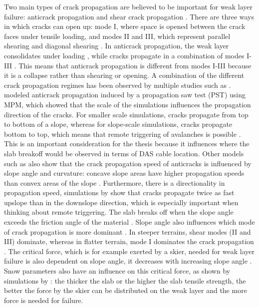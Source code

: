   Two main types of crack propagation are believed to be important for weak layer failure: anticrack propagation and shear crack propagation \parencite{bergfeldSignaturesSubRayleighSupershear2025}. There are three ways in which cracks can open up: mode I, where space is opened between the crack faces under tensile loading, and modes II and III, which represent parallel shearing and diagonal shearing \parencite{heierliAnticracksNewTheory2003}. In anticrack propagation, the weak layer consolidates under loading \parencite{knightSuperheatedIceTrue1972}, while cracks propagate in a combination of modes I-III \parencite{heierliAnticracksNewTheory2003}. This means that anticrack propagation is different from modes I-III because it is a collapse rather than shearing or opening. A combination of the different crack propagation regimes has been observed by multiple studies such as \cite{gaumeModelingCrackPropagation2015,mulakNumericalInvestigationMixedmode2019}. \cite{gaumeDynamicAnticrackPropagation2018} modeled anticrack propagation induced by a propagation saw test (PST) using MPM, which showed that the scale of the simulations influences the propagation direction of the cracks. For smaller scale simulations, cracks propagate from top to bottom of a slope, whereas for slope-scale simulations, cracks propagate bottom to top, which means that remote triggering of avalanches is possible \parencite{gaumeDynamicAnticrackPropagation2018}. This is an important consideration for the thesis because it influences where the slab breakoff would be observed in terms of DAS cable location. Other models such as \cite{mulakNumericalInvestigationMixedmode2019,gaumeInvestigatingReleaseFlow2019} also show that the crack propagation speed of anticracks is influenced by slope angle and curvature: concave slope areas have higher propagation speeds than convex areas of the slope \parencite{gaumeInvestigatingReleaseFlow2019}. Furthermore, there is a directionality in propagation speed, simulations by \cite{gaumeInvestigatingReleaseFlow2019} show that cracks propagate twice as fast upslope than in the downslope direction, which is especially important when thinking about remote triggering. The slab breaks off when the slope angle exceeds the friction angle of the material \parencite{gaumeInvestigatingReleaseFlow2019}. Slope angle also influences which mode of crack propagation is more dominant \parencite{rosendahlModelingSnowSlab2020}. In steeper terrains, shear modes (II and III) dominate, whereas in flatter terrain, mode I dominates the crack propagation \parencite{rosendahlModelingSnowSlab2020}. The critical force, which is for example exerted by a skier, needed for weak layer failure is also dependent on slope angle, it decreases with increasing slope angle \parencite{rosendahlModelingSnowSlab2020}. Snow parameters also have an influence on this critical force, as shown by simulations by \cite{rosendahlModelingSnowSlab2020}: the thicker the slab or the higher the slab tensile strength, the better the force by the skier can be distributed on the weak layer and the more force is needed for failure. \par

